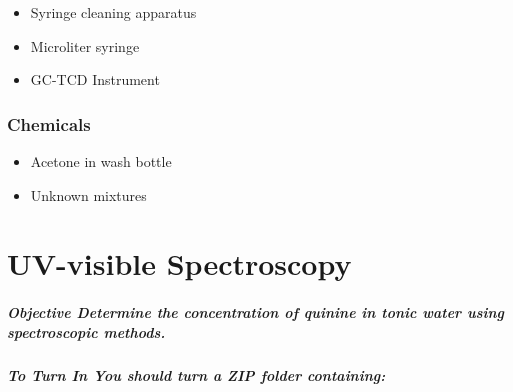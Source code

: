 \documentclass[]{tufte-book}
\providecommand{\tightlist}{%
  \setlength{\itemsep}{0pt}\setlength{\parskip}{0pt}}
\begin{document}
\begin{itemize}
\tightlist
\item
  Syringe cleaning apparatus
\item
  Microliter syringe
\item
  GC-TCD Instrument
\end{itemize}

\hypertarget{chemicals}{%
\subsection*{Chemicals}\label{chemicals}}

\begin{itemize}
\tightlist
\item
  Acetone in wash bottle
\item
  Unknown mixtures
\end{itemize}

\hypertarget{uv-visible-spectroscopy}{%
\chapter{UV-visible Spectroscopy}\label{uv-visible-spectroscopy}}

\hypertarget{objective-determine-the-concentration-of-quinine-in-tonic-water-using-spectroscopic-methods.}{%
\paragraph{\texorpdfstring{\textbf{Objective} \textbar{} Determine the concentration of quinine in tonic water using spectroscopic methods.}{Objective \textbar{} Determine the concentration of quinine in tonic water using spectroscopic methods.}}\label{objective-determine-the-concentration-of-quinine-in-tonic-water-using-spectroscopic-methods.}}

\hypertarget{to-turn-in-you-should-turn-a-zip-folder-containing-1}{%
\paragraph{\texorpdfstring{\textbf{To Turn In} \textbar{} You should turn a ZIP folder containing:}{To Turn In \textbar{} You should turn a ZIP folder containing:}}\label{to-turn-in-you-should-turn-a-zip-folder-containing-1}}
\end{document}

